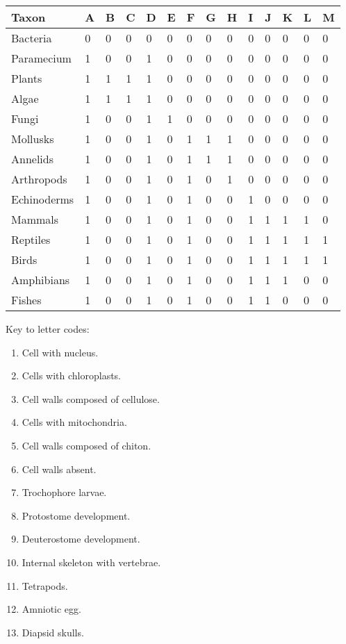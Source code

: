 \documentclass[12pt, hidelinks]{exam}
\begin{document}
\begin{landscape}

\begin{longtable}{@{}L{1in}L{0.25in}L{0.25in}L{0.25in}L{0.25in}L{0.25in}L{0.25in}L{0.25in}L{0.25in}L{0.25in}L{0.25in}L{0.25in}L{0.25in}L{0.25in}@{}}
\toprule
Taxon			&	A	&	B	&	C	&	D	&	E	&	F	&	G	&	H	&	I	&	J	&	K	&	L	&	M	\tabularnewline
\midrule
Bacteria		&	0	&	0	&	0	&	0	&	0	&	0	&	0	&	0	&	0	&	0	&	0	&	0	&	0	\tabularnewline
Paramecium	&	1	&	0	&	0	&	1	&	0	&	0	&	0	&	0	&	0	&	0	&	0	&	0	&	0	\tabularnewline
Plants			&	1	&	1	&	1	&	1	&	0	&	0	&	0	&	0	&	0	&	0	&	0	&	0	&	0	\tabularnewline
Algae			&	1	&	1	&	1	&	1	&	0	&	0	&	0	&	0	&	0	&	0	&	0	&	0	&	0	\tabularnewline
Fungi			&	1	&	0	&	0	&	1	&	1	&	0	&	0	&	0	&	0	&	0	&	0	&	0	&	0	\tabularnewline
Mollusks		&	1	&	0	&	0	&	1	&	0	&	1	&	1	&	1	&	0	&	0	&	0	&	0	&	0	\tabularnewline
Annelids		&	1	&	0	&	0	&	1	&	0	&	1	&	1	&	1	&	0	&	0	&	0	&	0	&	0	\tabularnewline
Arthropods	&	1	&	0	&	0	&	1	&	0	&	1	&	0	&	1	&	0	&	0	&	0	&	0	&	0	\tabularnewline
Echinoderms	&	1	&	0	&	0	&	1	&	0	&	1	&	0	&	0	&	1	&	0	&	0	&	0	&	0	\tabularnewline
Mammals		&	1	&	0	&	0	&	1	&	0	&	1	&	0	&	0	&	1	&	1	&	1	&	1	&	0	\tabularnewline
Reptiles		&	1	&	0	&	0	&	1	&	0	&	1	&	0	&	0	&	1	&	1	&	1	&	1	&	1	\tabularnewline
Birds				&	1	&	0	&	0	&	1	&	0	&	1	&	0	&	0	&	1	&	1	&	1	&	1	&	1	\tabularnewline
Amphibians	&	1	&	0	&	0	&	1	&	0	&	1	&	0	&	0	&	1	&	1	&	1	&	0	&	0	\tabularnewline
Fishes			&	1	&	0	&	0	&	1	&	0	&	1	&	0	&	0	&	1	&	1	&	0	&	0	&	0	\tabularnewline

\bottomrule
\end{longtable}\label{presence_table}

Key to letter codes:

\begin{multicols}{3}
	\raggedcolumns
	\begin{enumerate}
		\item Cell with nucleus.
		\item Cells with chloroplasts.
		\item Cell walls composed of cellulose.
		\item Cells with mitochondria.
		\item Cell walls composed of chiton.
		\item Cell walls absent.
		\item Trochophore larvae.
		\item Protostome development.
		\item Deuterostome development.
		\item	Internal skeleton with vertebrae.
		\item Tetrapods.
		\item Amniotic egg.
		\item Diapsid skulls.
	\end{enumerate}
\end{multicols}



\end{landscape}
\end{document}
